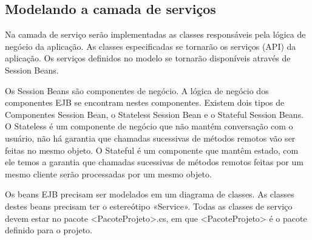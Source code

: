 \subsection{Modelando a camada de serviços}

Na camada de serviço serão implementadas as classes responsáveis pela lógica de
negócio da aplicação. As classes especificadas se tornarão os serviços (API) da
aplicação. Os serviços definidos no modelo se tornarão disponíveis através de
Session Beans.

Os Session Beans são componentes de negócio. A lógica de negócio dos componentes
EJB se encontram nestes componentes. Existem dois tipos de Componentes Session
Bean, o Stateless Session Bean e o Stateful Session Beans. O Stateless é um
componente de negócio que não mantém conversação com o usuário, não há garantia
que chamadas sucessivas de métodos remotos vão ser feitas no mesmo objeto. O
Stateful é um componente que mantêm estado, com ele temos a garantia que
chamadas sucessivas de métodos remotos feitas por um mesmo cliente serão
processadas por um mesmo objeto.

Os beans EJB precisam ser modelados em um diagrama de classes. As classes destes
beans precisam ter o estereótipo «Service». Todas as classes de serviço devem
estar no pacote <PacoteProjeto>.cs, em que <PacoteProjeto> é o pacote definido
para o projeto.


